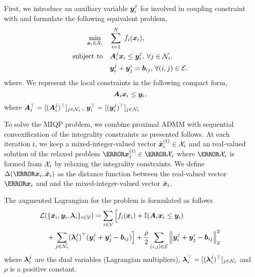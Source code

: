 \documentclass[twocolumn,amsthm]{autart}%
\theoremstyle{definition}
\theoremstyle{plain}
\begin{document}
First, we introduce an auxiliary variable $\boldsymbol{y}_{i}^{j}$ for  involved in coupling constraint with  and formulate the following equivalent problem,
\begin{equation}
\begin{split}
\underset{\boldsymbol{x}_i \in \mathcal{X}_i}{\min} & \quad \sum_{i=1}^N \; f_i (\boldsymbol{x}_i), \\
\text{subject to} & \quad \boldsymbol{A}^{j}_{i} \boldsymbol{x}_i \le \boldsymbol{y}_{i}^{j}, \, \forall j \in \mathcal{N}_i, \\
& \quad \boldsymbol{y}_{i}^{j} + \boldsymbol{y}_{j}^{i} = \boldsymbol{b}_{ij},\, \forall (i,j) \in \mathcal{E}.
\end{split}
\end{equation}
where.
We represent the local constraints in the following compact form, 
\begin{equation}
\boldsymbol{A}_{i} \boldsymbol{x}_i \le \boldsymbol{y}_{i},
\end{equation}
where $\boldsymbol{A}_{i}^\top = [(\boldsymbol{A}_{i}^{j})^\top]_{j \in \mathcal{N}_i}$, $\boldsymbol{y}_{i}^\top = [(\boldsymbol{y}_{i}^{j})^\top]_{j \in \mathcal{N}_i}$

To solve the MIQP problem, we combine proximal ADMM \cite{yang2022proximal} with sequential convexification of the integrality constraints as presented follows.
At each iteration $t$, we keep a mixed-integer-valued vector $\tilde{\boldsymbol{x}}_i^{(t)} \in \mathcal{X}_i$ and an real-valued solution of the relaxed problem $\bar{\bbsym{x}}_i^{(t)} \in \bar{\XXX}_i$ where $\bar{\XXX}_i$ is formed from $\mathcal{X}_i$ by relaxing the integrality constraints.
We define $\Delta (\bar{\bbsym{x}}_i, \tilde{\bbsym{x}}_i)$ as the distance function between the real-valued vector $\bar{\bbsym{x}}_i$ and and the mixed-integer-valued vector $\tilde{\boldsymbol{x}}_i$.

The augmented Lagrangian for the problem is formulated as follows
\begin{equation}
\begin{multlined}
\LLL ( \{ \bbsym{x}_i, \bbsym{y}_i, \bbsym{\lambda}_{i} \}_{i\in \VVV}) = \sum_{i \in \VVV} \Big[ f_i (\bbsym{x}_i) + \II (\bbsym{A}_{i} \bbsym{x}_i \le \bbsym{y}_{i}) \\
+ \sum_{j \in \NNN_i} (\bbsym{\lambda}_{i}^j)^\top (\bbsym{y}_{i}^{j} + \bbsym{y}_{j}^{i} - \bbsym{b}_{ij}) \Big] 
+ \frac{\rho}{2} \sum_{(i,j) \in \EEE} \norm{\bbsym{y}_{i}^{j} + \bbsym{y}_{j}^{i} - \bbsym{b}_{ij}}_2^2
\end{multlined}
\end{equation}
where $\boldsymbol{\lambda}_{i}^j$ are the dual variables (Lagrangian multipliers), $\boldsymbol{\lambda}_{i}^\top = [(\boldsymbol{\lambda}_{i}^j)^\top]_{j \in \mathcal{N}_i}$ and $\rho$ is a positive constant.
\end{document}
